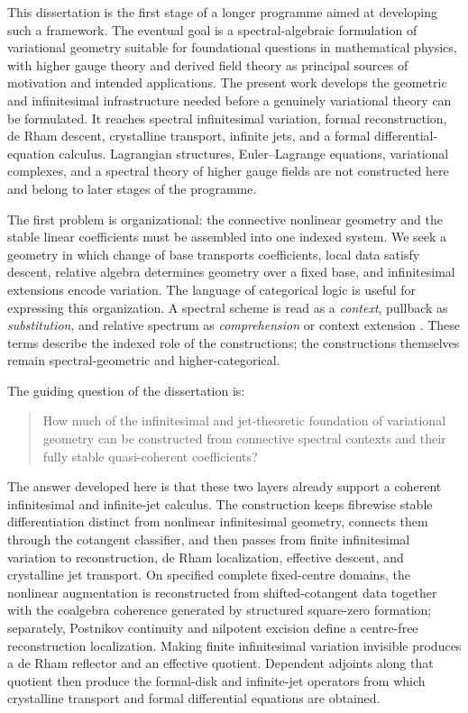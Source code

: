 This dissertation is the first stage of a longer programme aimed at
developing such a framework.  The eventual goal is a spectral-algebraic
formulation of variational geometry suitable for foundational questions in
mathematical physics, with higher gauge theory and derived field theory as
principal sources of motivation and intended applications.  The present work
develops the
geometric and infinitesimal infrastructure needed before a genuinely
variational theory can be formulated.  It reaches spectral infinitesimal
variation, formal reconstruction, de Rham descent, crystalline transport,
infinite jets, and a formal differential-equation calculus.  Lagrangian
structures, Euler--Lagrange equations, variational complexes, and a spectral
theory of higher gauge fields are not constructed here and belong to later
stages of the programme.

The first problem is organizational: the connective nonlinear
geometry and the stable linear coefficients must be assembled into one
indexed system.  We seek a geometry in which change of base transports
coefficients, local data satisfy descent, relative algebra determines geometry
over a fixed base, and infinitesimal extensions encode variation.  The
language of categorical logic is useful for expressing this organization.  A
spectral scheme is read as a \emph{context}, pullback as \emph{substitution},
and relative spectrum as \emph{comprehension} or context extension
\cite{JacobsCategoricalLogic}.  These terms describe the indexed role of the
constructions; the constructions themselves remain spectral-geometric and
higher-categorical.

The guiding question of the dissertation is:

\begin{quote}
How much of the infinitesimal and jet-theoretic foundation of variational
geometry can be constructed from connective spectral contexts and their fully
stable quasi-coherent coefficients?
\end{quote}

The answer developed here is that these two layers already support a coherent
infinitesimal and infinite-jet calculus.  The construction keeps fibrewise
stable differentiation distinct from nonlinear infinitesimal geometry,
connects them through the cotangent classifier, and then passes from finite
infinitesimal variation to reconstruction, de Rham localization, effective
descent, and crystalline jet transport.  On specified complete fixed-centre
domains, the nonlinear augmentation is reconstructed from shifted-cotangent
data together with the coalgebra coherence generated by structured
square-zero formation; separately, Postnikov continuity and nilpotent
excision define a centre-free reconstruction localization.
Making finite infinitesimal variation invisible produces a de Rham reflector
and an effective quotient.  Dependent adjoints along that quotient then
produce the formal-disk and infinite-jet operators from which crystalline
transport and formal differential equations are obtained.

